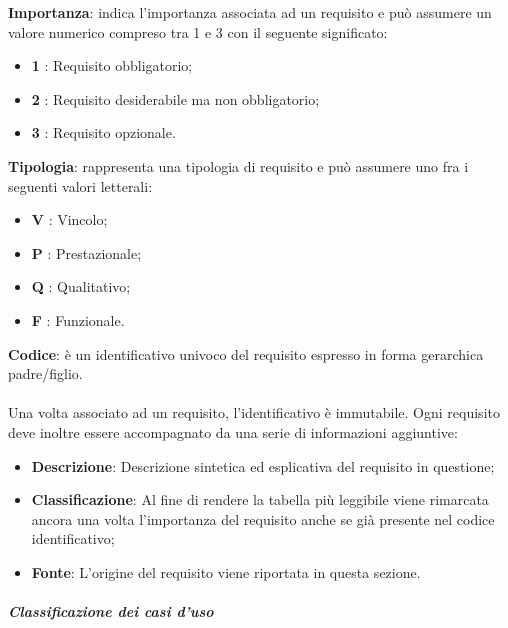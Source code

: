         \textbf{Importanza}: indica l'importanza associata ad un requisito e può assumere un valore numerico compreso tra 1 e 3 con il seguente significato:
            \begin{itemize}[label={}]
                \item \textbf{1} : Requisito obbligatorio;
                \item \textbf{2} : Requisito desiderabile ma non obbligatorio;
                \item \textbf{3} : Requisito opzionale.
            \end{itemize}

        \textbf{Tipologia}: rappresenta una tipologia di requisito e può assumere uno fra i seguenti valori letterali:
        \begin{itemize}[label={}]
            \item \textbf{V} : Vincolo;
            \item \textbf{P} : Prestazionale;
            \item \textbf{Q} : Qualitativo;
            \item \textbf{F} : Funzionale.
        \end{itemize}

        \textbf{Codice}: è un identificativo univoco del requisito espresso in forma gerarchica padre/figlio.
        \\
        \\
        Una volta associato ad un requisito, l'identificativo è immutabile.
        Ogni requisito deve inoltre essere accompagnato da una serie di informazioni aggiuntive:
        \begin{itemize}
            \item \textbf{Descrizione}: Descrizione sintetica ed esplicativa del requisito in questione;
            \item \textbf{Classificazione}: Al fine di rendere la tabella più leggibile viene rimarcata ancora una volta l'importanza del requisito anche se già presente nel codice identificativo;
            \item \textbf{Fonte}: L'origine del requisito viene riportata in questa sezione.
        \end{itemize}


        \subparagraph{Classificazione dei casi d'uso}



